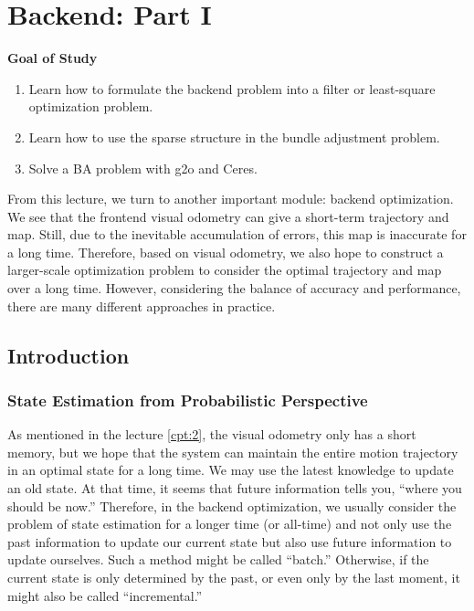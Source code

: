 \chapter{Backend: Part I}
\label{cpt:backend1}
\label{cpt:9}
\begin{mdframed}  
	\textbf{Goal of Study}
	\begin{enumerate}[labelindent=0em,leftmargin=1.5em]
		\item Learn how to formulate the backend problem into a filter or least-square optimization problem.
		\item Learn how to use the sparse structure in the bundle adjustment problem. 
		\item Solve a BA problem with g2o and Ceres.
	\end{enumerate}
\end{mdframed}

From this lecture, we turn to another important module: backend optimization.
We see that the frontend visual odometry can give a short-term trajectory and map. Still, due to the inevitable accumulation of errors, this map is inaccurate for a long time. Therefore, based on visual odometry, we also hope to construct a larger-scale optimization problem to consider the optimal trajectory and map over a long time. However, considering the balance of accuracy and performance, there are many different approaches in practice.

\newpage


\newpage
\section{Introduction}
\subsection{State Estimation from Probabilistic Perspective}
As mentioned in the lecture \ref{cpt:2}, the visual odometry only has a short memory, but we hope that the system can maintain the entire motion trajectory in an optimal state for a long time. We may use the latest knowledge to update an old state. At that time, it seems that future information tells you, ``where you should be now.'' Therefore, in the backend optimization, we usually consider the problem of state estimation for a longer time (or all-time) and not only use the past information to update our current state but also use future information to update ourselves. Such a method might be called ``batch.'' Otherwise, if the current state is only determined by the past, or even only by the last moment, it might also be called ``incremental.''

